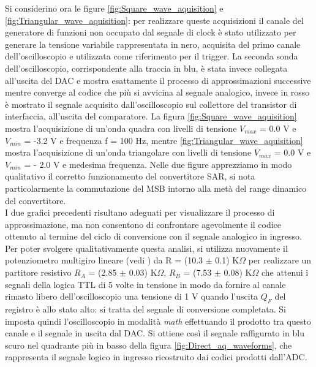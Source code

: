 \documentclass[journal]{IEEEtran}
\begin{document}
Si considerino ora le figure \ref{fig:Square_wave_aquisition} e \ref{fig:Triangular_wave_aquisition}: per realizzare queste acquisizioni il canale del generatore di funzioni non occupato dal segnale di clock è stato utilizzato per generare la tensione variabile rappresentata in nero, acquisita del primo canale dell'oscilloscopio e utilizzata come riferimento per il trigger. La seconda sonda dell'oscilloscopio, corrispondente alla traccia in blu, è stata invece collegata all'uscita del DAC e mostra esattamente il processo di approssimazioni successive mentre converge al codice che più si avvicina al segnale analogico, invece in rosso è mostrato il segnale acquisito dall'oscilloscopio sul collettore del transistor di interfaccia, all'uscita del comparatore. 
La figura \ref{fig:Square_wave_aquisition} mostra l'acquisizione di un'onda quadra con livelli di tensione $V_{max}$ = 0.0 V e $V_{min}$ = -3.2 V e frequenza f = 100 Hz, mentre \ref{fig:Triangular_wave_aquisition} mostra l'acquisizione di un'onda triangolare con livelli di tensione $V_{max}$ = 0.0 V e $V_{min}$ = - 2.0 V e medesima frequenza. Nelle due figure apprezziamo in modo qualitativo il corretto funzionamento del convertitore SAR, si nota particolarmente la commutazione del MSB intorno alla metà del range dinamico del convertitore. \\

I due grafici precedenti risultano adeguati per visualizzare il processo di approssimazione, ma non consentono di confrontare agevolmente il codice ottenuto al termine del ciclo di conversione con il segnale analogico in ingresso. Per poter svolgere qualitativamente questa analisi, si utilizza nuovamente il potenziometro multigiro lineare (vedi \cite{K}) da R = (10.3 $\pm$ 0.1) K$\Omega$ per realizzare un partitore resistivo $R_A$ = (2.85 $\pm$ 0.03) K$\Omega$, $R_B$ = (7.53 $\pm$ 0.08) K$\Omega$ che attenui i segnali della logica TTL di 5 volte in tensione in modo da fornire al canale rimasto libero dell'oscilloscopio una tensione di 1 V quando l'uscita $Q_F$ del registro è allo stato alto: si tratta del segnale di conversione completata. Si imposta quindi l'oscilloscopio in modalità \textit{math} effettuando il prodotto tra questo canale e il segnale in uscita dal DAC. Si ottiene così il segnale raffigurato in blu scuro nel quadrante più in basso della figura \ref{fig:Direct_aq_waveforms}, che rappresenta il segnale logico in ingresso ricostruito dai codici prodotti dall'ADC. \\
\vspace{-10 mm}
\end{document}
